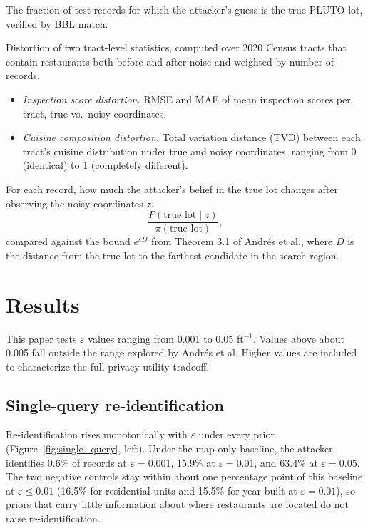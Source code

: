\documentclass[11pt]{article}
\begin{document}
\begin{description}[leftmargin=1.5em, style=nextline]
    \item[Re-identification rate.] The fraction of test records for which the attacker's guess is the true PLUTO lot, verified by BBL match.

    \item[Utility loss.] Distortion of two tract-level statistics, computed over 2020 Census tracts that contain restaurants both before and after noise and weighted by number of records.
    \begin{itemize}[leftmargin=1.5em]
        \item \emph{Inspection score distortion.} RMSE and MAE of mean inspection scores per tract, true vs.\ noisy coordinates.
        \item \emph{Cuisine composition distortion.} Total variation distance (TVD) between each tract's cuisine distribution under true and noisy coordinates, ranging from 0 (identical) to 1 (completely different).
    \end{itemize}

    \item[Posterior-to-prior ratio.] For each record, how much the attacker's belief in the true lot changes after observing the noisy coordinates $z$,
    \begin{equation}
        \frac{P(\text{true lot} \mid z)}{\pi(\text{true lot})},
    \end{equation}
    compared against the bound $e^{\varepsilon D}$ from Theorem 3.1 of Andr\'es et al., where $D$ is the distance from the true lot to the farthest candidate in the search region.
\end{description}

\section{Results}

This paper tests $\varepsilon$ values ranging from 0.001 to 0.05 ft$^{-1}$. Values above about 0.005 fall outside the range explored by Andr\'es et al. Higher values are included to characterize the full privacy-utility tradeoff.

\subsection{Single-query re-identification}

Re-identification rises monotonically with $\varepsilon$ under every prior (Figure~\ref{fig:single_query}, left). Under the map-only baseline, the attacker identifies 0.6\% of records at $\varepsilon = 0.001$, 15.9\% at $\varepsilon = 0.01$, and 63.4\% at $\varepsilon = 0.05$. The two negative controls stay within about one percentage point of this baseline at $\varepsilon \le 0.01$ (16.5\% for residential units and 15.5\% for year built at $\varepsilon = 0.01$), so priors that carry little information about where restaurants are located do not raise re-identification.
\end{document}
